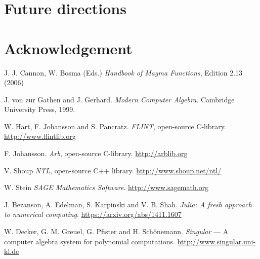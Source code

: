 \documentclass{sig-alternate-05-2015}
\begin{document}
\section{Future directions}

\section{Acknowledgement}


\begin{thebibliography}{99}

J. J. Cannon, W. Bosma (Eds.) {\em Handbook of Magma Functions}, Edition 2.13 (2006)

J. von zur Gathen and J. Gerhard. {\em Modern Computer Algebra}. Cambridge University Press, 1999.

W. Hart, F. Johansson and S. Pancratz. {\em FLINT}, open-source C-library. \url{http://www.flintlib.org}

F. Johansson. {\em Arb}, open-source C-library. \url{http://arblib.org}

V. Shoup {\em NTL}, open-source C++ library. \url{http://www.shoup.net/ntl/}

W. Stein {\em SAGE Mathematics Software}.  \url{http://www.sagemath.org}

 J. Bezanson, A. Edelman, S. Karpinski and V. B. Shah. {\em Julia: A fresh approach to numerical computing}. \url{https://arxiv.org/abs/1411.1607}

 W. Decker, G. M. Greuel, G. Pfister and H. Sch\"onemann. {\em Singular} --- A computer algebra system for polynomial computations. \url{http://www.singular.uni-kl.de}

\end{thebibliography}
\end{document}
